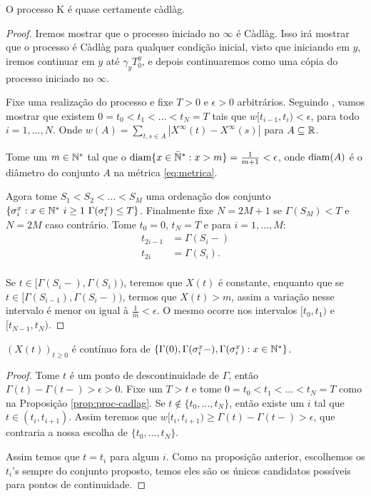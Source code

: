 \begin{proposicao}
  \label{prop:proc-cadlag}
  O processo K é quase certamente càdlàg.
\end{proposicao}
\begin{proof}

  Iremos mostrar que o processo iniciado no $\infty$ é Càdlàg. Isso
  irá mostrar que o processo é Càdlàg para qualquer condição inicial,
  visto que iniciando em $y$, iremos continuar em $y$ até $\gamma_y
  T^y_0$, e depois continuaremos como uma cópia do processo iniciado no
  $\infty$.

  Fixe uma realização do processo e fixe $T > 0$ e $\epsilon > 0$
  arbitrários. Seguindo \cite{billingsley:99}, vamos mostrar que
  existem $0 = t_0 < t_1 < \ldots < t_N = T$ tais que $w[t_{i-1}, t_i)
  < \epsilon$, para todo $i = 1, \ldots, N$. Onde $w(A) = \sum_{t, s
    \in A} |X^\infty(t) - X^\infty(s)|$ para $A \subseteq {\mathbb{R}}$.

  Tome um $m \in {\mathbb{N^*}}$ tal que o ${\mathrm{diam}}\{x \in {\mathbb{\bar{N}^*}}: x > m \} =
  \frac{1}{m+1} < \epsilon$, onde ${\mathrm{diam}}(A)$ é o diâmetro do conjunto
  $A$ na métrica \eqref{eq:metrica}.

  Agora tome $S_1 < S_2 < \ldots < S_M$ uma ordenação dos conjunto $\{
  \sigma^x_i: x \in {\mathbb{N^*}} \,\, i \geq 1 \,\, \Gamma(\sigma^x_i) \leq
  T\}$. Finalmente fixe $N = 2M+1$ se $\Gamma(S_M) < T$ e $N = 2M$
  caso contrário. Tome $t_0 = 0$, $t_N = T$ e para $i=1,\ldots, M$:
  \begin{align*}
    t_{2i-1} &= \Gamma(S_i-)\\
    t_{2i} &= \Gamma(S_i).\\
  \end{align*}

  Se $t \in [\Gamma(S_i-), \Gamma(S_i))$, teremos que
  $X(t)$ é constante, enquanto que se $t \in
  [\Gamma(S_{i-1}), \Gamma(S_{i}-))$, termos que
  $X(t) > m$, assim a variação nesse intervalo é menor ou igual
  à $\frac{1}{m} < \epsilon$. O mesmo ocorre nos intervalos $[t_0,
  t_1)$ e $[t_{N-1}, t_N)$.
\end{proof}

\begin{proposicao}
  \label{prop:proc-descontinuidades}
  $(X(t))_{t\geq 0}$ é \qc contínuo fora de $\{ \Gamma(0),
  \Gamma(\sigma_i^x-), \Gamma(\sigma_i^x): x \in {\mathbb{N^*}}\}$.
\end{proposicao}
\begin{proof}
  Tome $t$ é um ponto de descontinuidade de $\Gamma$, então $\Gamma(t) -
  \Gamma(t-) > \epsilon > 0$. Fixe um $T > t$ e tome $0 = t_0 < t_1 <
  \ldots < t_N = T$ como na Proposição \ref{prop:proc-cadlag}. Se
  $t \not\in \{t_0, \ldots, t_N\}$, então existe um $i$ tal que $t \in
  (t_i, t_{i+1})$. Assim teremos que $w[t_i, t_{i+1}) \geq \Gamma(t) -
  \Gamma(t-) > \epsilon$, que contraria a nossa escolha de $\{t_0,
  \ldots, t_N\}$.

  Assim temos que $t = t_i$ para algum $i$. Como na proposição
  anterior, escolhemos os $t_i$'s sempre do conjunto proposto, temos
  eles são os únicos candidatos possíveis para pontos de continuidade.
\end{proof}

